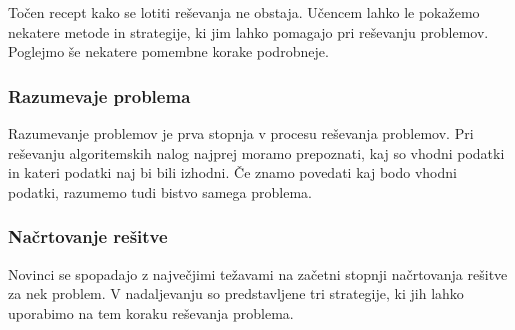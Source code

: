 Točen recept kako se lotiti reševanja ne obstaja. Učencem lahko le
pokažemo nekatere metode in strategije, ki jim lahko pomagajo pri
reševanju problemov. Poglejmo še nekatere pomembne korake podrobneje.

\subsubsection{Razumevaje problema}
\label{sec:razumevanje problema}

Razumevanje problemov je prva stopnja v procesu reševanja
problemov. Pri reševanju algoritemskih nalog najprej moramo
prepoznati, kaj so vhodni podatki in kateri podatki naj bi bili
izhodni. Če znamo povedati kaj bodo vhodni podatki, razumemo tudi
bistvo samega problema.

\subsubsection{Načrtovanje rešitve}
\label{sec:načrtovanje_rešitve}

Novinci se spopadajo z največjimi težavami na začetni stopnji
načrtovanja rešitve za nek problem. V nadaljevanju so predstavljene
tri strategije, ki jih lahko uporabimo na tem koraku reševanja
problema.

